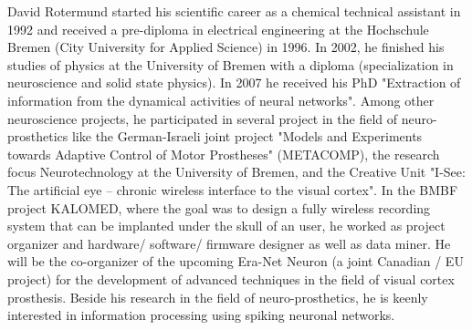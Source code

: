 \begin{IEEEbiography}{David Rotermund} started his scientific career as a chemical technical assistant in 1992 and received a pre-diploma in electrical engineering at the Hochschule Bremen (City University for Applied Science) in 1996. In 2002, he finished his studies of physics at the University of Bremen with a diploma (specialization in neuroscience and solid state physics). In 2007 he received his PhD "Extraction of information from the dynamical activities of neural networks". Among other neuroscience projects, he participated in several project in the field of neuro-prosthetics like the German-Israeli joint project "Models and Experiments towards Adaptive Control of Motor Prostheses" (METACOMP), the research focus Neurotechnology at the University of Bremen, and the Creative Unit "I-See: The artificial eye -- chronic wireless interface to the visual cortex". In the BMBF project KALOMED, where the goal was to design a fully wireless recording system that can be implanted under the skull of an user, he worked as project organizer and hardware/ software/ firmware designer as well as data miner. He will be the co-organizer of the upcoming Era-Net Neuron (a joint Canadian / EU project) for the development of advanced techniques in the field of visual cortex prosthesis. Beside his research in the field of neuro-prosthetics, he is keenly interested in information processing using spiking neuronal networks.
\end{IEEEbiography}

